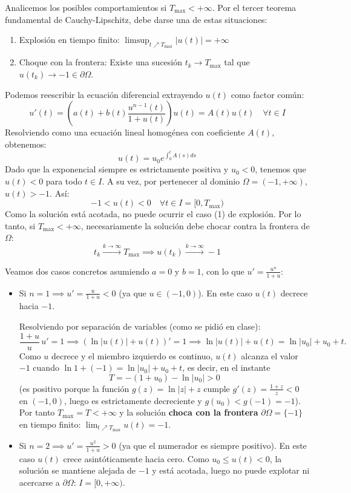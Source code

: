 {    Analicemos los posibles comportamientos si $T_{\max} < +\infty$. Por el tercer teorema fundamental de Cauchy-Lipschitz, debe darse una de estas situaciones:
    \begin{enumerate}
        \item Explosión en tiempo finito: $\limsup_{t \nearrow T_{\max}} |u(t)| = +\infty$
        \item Choque con la frontera: Existe una sucesión $t_k \to T_{\max}$ tal que $u(t_k) \to -1 \in \partial \Omega$.
    \end{enumerate}

    Podemos reescribir la ecuación diferencial extrayendo $u(t)$ como factor común:
    \[
        u'(t) = \left( a(t) + b(t)\frac{u^{n-1}(t)}{1+u(t)} \right) u(t) = A(t)u(t) \quad \forall t \in I
    \]
    Resolviendo como una ecuación lineal homogénea con coeficiente $A(t)$, obtenemos:
    \[
        u(t) = u_0 e^{\int_0^t A(s) ds}
    \]
    Dado que la exponencial siempre es estrictamente positiva y $u_0 < 0$, tenemos que $u(t) < 0$ para todo $t \in I$. A su vez, por pertenecer al dominio $\Omega = (-1, +\infty)$, $u(t) > -1$. Así:
    \[
        -1 < u(t) < 0 \quad \forall t \in I = [0, T_{\max})
    \]
    Como la solución está acotada, no puede ocurrir el caso (1) de explosión. Por lo tanto, si $T_{\max} < +\infty$, necesariamente la solución debe chocar contra la frontera de $\Omega$:
    \[
        t_k \xrightarrow{k \to \infty} T_{\max} \implies u(t_k) \xrightarrow{k \to \infty} -1
    \]

    Veamos dos casos concretos asumiendo $a=0$ y $b=1$, con lo que $u' = \frac{u^n}{1+u}$:
    \begin{itemize}
        \item Si $n=1 \implies u' = \frac{u}{1+u} < 0$ (ya que $u \in (-1,0)$). En este caso $u(t)$ decrece hacia $-1$.

        Resolviendo por separación de variables (como se pidió en clase):
        \[
            \frac{1+u}{u} \, u' = 1 \implies \left( \ln|u(t)| + u(t) \right)' = 1 \implies \ln|u(t)| + u(t) = \ln|u_0| + u_0 + t.
        \]
        Como $u$ decrece y el miembro izquierdo es continuo, $u(t)$ alcanza el valor $-1$ cuando $\ln 1 + (-1) = \ln|u_0| + u_0 + t$, es decir, en el instante
        \[
            T = -(1 + u_0) - \ln|u_0| > 0
        \]
        (es positivo porque la función $g(z) = \ln|z| + z$ cumple $g'(z) = \frac{1+z}{z} < 0$ en $(-1, 0)$, luego es estrictamente decreciente y $g(u_0) < g(-1) = -1$). Por tanto $T_{\max} = T < +\infty$ y la solución \textbf{choca con la frontera} $\partial \Omega = \{-1\}$ en tiempo finito: $\lim_{t \nearrow T_{\max}} u(t) = -1$.
        \item Si $n=2 \implies u' = \frac{u^2}{1+u} > 0$ (ya que el numerador es siempre positivo). En este caso $u(t)$ crece asintóticamente hacia cero. Como $u_0 \le u(t) < 0$, la solución se mantiene alejada de $-1$ y está acotada, luego no puede explotar ni acercarse a $\partial \Omega$: $I = [0, +\infty)$.
    \end{itemize}
}

